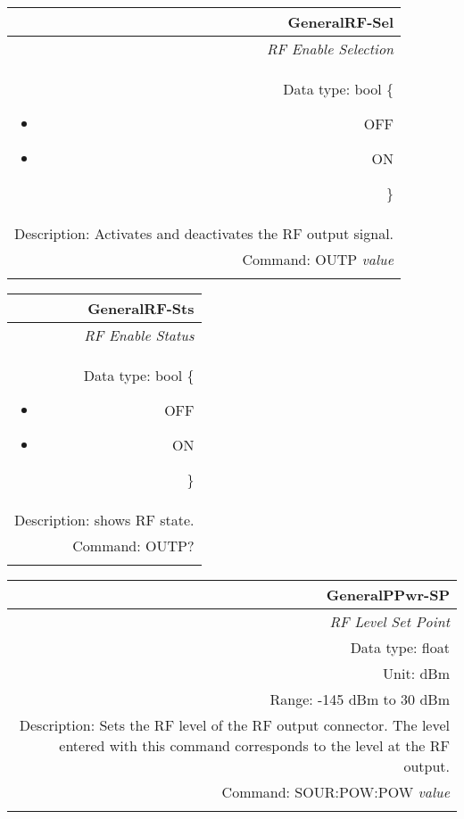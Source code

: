 \documentclass[openany]{article}
\begin{document}
		\begin{tabular}{N}
			\hline
			\bfseries GeneralRF-Sel \\ \hline
			\emph{RF Enable Selection} \\
			Data type: bool \{\begin{itemize}[noitemsep]
				\small
				\item[] OFF
				\item[] ON
			\end{itemize}\} \\
			Description: Activates and deactivates the RF output signal. \\
			Command: OUTP \emph{value} \\
			\\

		\end{tabular}


		\begin{tabular}{N}
			\hline
			\bfseries GeneralRF-Sts \\ \hline
			\emph{RF Enable Status} \\
			Data type: bool \{\begin{itemize}[noitemsep]
				\small
				\item[] OFF
				\item[] ON
			\end{itemize}\} \\
			Description: shows RF state. \\
			Command: OUTP? \\
			\\

		\end{tabular}


		\begin{tabular}{N}
			\hline
			\bfseries GeneralPPwr-SP \\ \hline
			\emph{RF Level Set Point} \\
			Data type: float \\
			Unit: dBm \\
			Range: -145 dBm to 30 dBm \\
			Description: Sets the RF level of the RF output connector. The level entered with this command corresponds to the level at the RF output. \\
			Command: SOUR:POW:POW \emph{value} \\
			\\

		\end{tabular}
\end{document}
